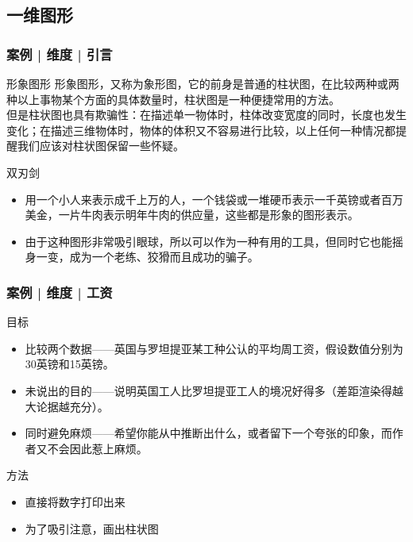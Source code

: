 \subsection{一维图形}
\begin{frame}
  \frametitle{案例 | 维度 | 引言}
  \begin{block}{形象图形}
    形象图形，又称为象形图，它的前身是普通的柱状图，在比较两种或两种以上事物某个方面的具体数量时，柱状图是一种便捷常用的方法。\\
但是柱状图也具有欺骗性：在描述单一物体时，柱体改变宽度的同时，长度也发生变化；在描述三维物体时，物体的体积又不容易进行比较，以上任何一种情况都提醒我们应该对柱状图保留一些怀疑。\\
  \end{block}
  \pause
  \begin{block}{双刃剑}
    \begin{itemize}
      \item 用一个小人来表示成千上万的人，一个钱袋或一堆硬币表示一千英镑或者百万美金，一片牛肉表示明年牛肉的供应量，这些都是形象的图形表示。
      \item 由于这种图形非常吸引眼球，所以可以作为一种有用的工具，但同时它也能摇身一变，成为一个老练、狡猾而且成功的骗子。
    \end{itemize}
  \end{block}
\end{frame}

\begin{frame}
  \frametitle{案例 | 维度 | 工资}
  \begin{block}{目标}
    \begin{itemize}
      \item 比较两个数据——英国与罗坦提亚某工种公认的平均周工资，假设数值分别为30英镑和15英镑。
      \item 未说出的目的——说明英国工人比罗坦提亚工人的境况好得多（差距渲染得越大论据越充分）。
      \item 同时避免麻烦——希望你能从中推断出什么，或者留下一个夸张的印象，而作者又不会因此惹上麻烦。
    \end{itemize}
  \end{block}
  \pause
  \begin{block}{方法}
    \begin{itemize}
      \item 直接将数字打印出来
      \item 为了吸引注意，画出柱状图
    \end{itemize}
  \end{block}
\end{frame}

